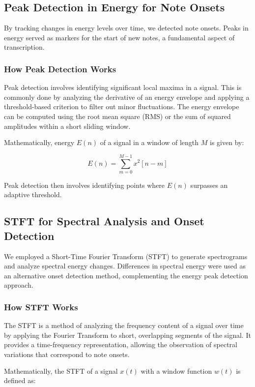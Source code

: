 \documentclass{article}
\begin{document}
\newpage

\subsection{Peak Detection in Energy for Note Onsets}
By tracking changes in energy levels over time, we detected note onsets. Peaks in energy served as markers for the start of new notes, a fundamental aspect of transcription.

\subsubsection{How Peak Detection Works}
Peak detection involves identifying significant local maxima in a signal. This is commonly done by analyzing the derivative of an energy envelope and applying a threshold-based criterion to filter out minor fluctuations. The energy envelope can be computed using the root mean square (RMS) or the sum of squared amplitudes within a short sliding window.

Mathematically, energy $E(n)$ of a signal in a window of length $M$ is given by:

\begin{equation}
E(n) = \sum_{m=0}^{M-1} x^2[n-m]
\end{equation}

Peak detection then involves identifying points where $E(n)$ surpasses an adaptive threshold.

\subsection{STFT for Spectral Analysis and Onset Detection}
We employed a Short-Time Fourier Transform (STFT) to generate spectrograms and analyze spectral energy changes. Differences in spectral energy were used as an alternative onset detection method, complementing the energy peak detection approach.

\subsubsection{How STFT Works}
The STFT is a method of analyzing the frequency content of a signal over time by applying the Fourier Transform to short, overlapping segments of the signal. It provides a time-frequency representation, allowing the observation of spectral variations that correspond to note onsets.

Mathematically, the STFT of a signal $x(t)$ with a window function $w(t)$ is defined as:
\end{document}
